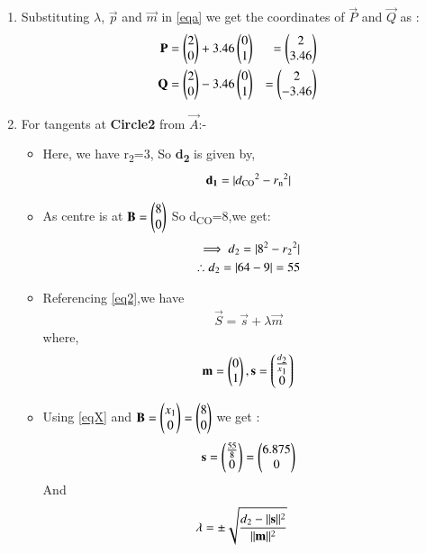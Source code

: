 \documentclass[journal,12pt,twocolumn]{IEEEtran}
\begin{document}
\begin{enumerate}
\item Substituting $\lambda$, $\vec{p}$ and $\vec{m}$ in \eqref{eqa} we get the coordinates of $\vec{P}$ and  $\vec{Q}$ as :
\begin{align}
\mathbf{P}&=\begin{pmatrix}2\\0\end{pmatrix}+ 3.46\begin{pmatrix}0\\1\end{pmatrix}&=\begin{pmatrix}2\\3.46\end{pmatrix}
\\
\mathbf{Q}&=\begin{pmatrix}2\\0\end{pmatrix}- 3.46\begin{pmatrix}0\\1\end{pmatrix}&=\begin{pmatrix}2\\-3.46\end{pmatrix}
\end{align}
\item For tangents at \textbf{Circle2} from $\vec{A}$:-
\begin{itemize}
\item Here, we have r\textsubscript{2}=3, So \textbf{d\textsubscript{2}} is given by,
\begin{align}
 \textbf{d\textsubscript{1}} = \lvert d\textsubscript{CO}^2-r\textsubscript{n}^2\vert
 \end{align}
\item  As  centre is at $\mathbf{B}=\begin{pmatrix}8\\0\end{pmatrix}$ So d\textsubscript{CO}=8,we get:
\begin{align}
 \implies d\textsubscript{2}=\lvert8^2-r\textsubscript{2}^2\vert 
 \\
  \therefore  d\textsubscript{2}=\lvert64-9\vert = 55\label{eqX}
\end{align}
\item Referencing \eqref{eq2},we have
\begin{align}
 \vec{S}=\vec{s}+\lambda \vec{m}   \label{eqb}
\end{align}
where,
\begin{align}
 \mathbf{m}=\begin{pmatrix}0\\1\end{pmatrix},\mathbf{s}=\begin{pmatrix}\frac{d\textsubscript{2}}{x\textsubscript{1}}\\0\end{pmatrix}
 \end{align}
 \item Using \eqref{eqX} and $\mathbf{B}=\begin{pmatrix}x\textsubscript{1}\\0\end{pmatrix}=\begin{pmatrix}8\\0\end{pmatrix}$ we get :
 \begin{align}
 \mathbf{s}=\begin{pmatrix}\frac{55}{8}\\0\end{pmatrix}=\begin{pmatrix}6.875\\0\end{pmatrix}
\end{align}
And
\begin{align}
\lambda &= \pm\sqrt{\frac {d\textsubscript{2}-\norm{\vec{s}}^2}{\norm{\vec{m}}^2}}

\end{align}
\end{itemize}
\end{enumerate}
\end{document}
